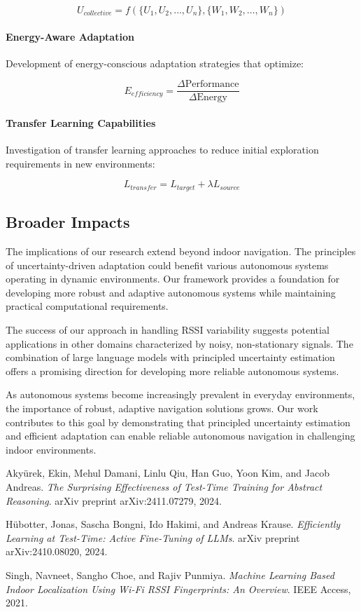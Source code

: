 \documentclass[12pt]{article}
\begin{document}
\[
U_{collective} = f(\{U_1, U_2, \ldots, U_n\}, \{W_1, W_2, \ldots, W_n\})
\]

\paragraph{Energy-Aware Adaptation}
Development of energy-conscious adaptation strategies that optimize:

\[
E_{efficiency} = \frac{\Delta \text{Performance}}{\Delta \text{Energy}}
\]

\paragraph{Transfer Learning Capabilities}
Investigation of transfer learning approaches to reduce initial exploration requirements in new environments:

\[
L_{transfer} = L_{target} + \lambda L_{source}
\]

\subsection{Broader Impacts}
The implications of our research extend beyond indoor navigation. The principles of uncertainty-driven adaptation could benefit various autonomous systems operating in dynamic environments. Our framework provides a foundation for developing more robust and adaptive autonomous systems while maintaining practical computational requirements.

The success of our approach in handling RSSI variability suggests potential applications in other domains characterized by noisy, non-stationary signals. The combination of large language models with principled uncertainty estimation offers a promising direction for developing more reliable autonomous systems.

As autonomous systems become increasingly prevalent in everyday environments, the importance of robust, adaptive navigation solutions grows. Our work contributes to this goal by demonstrating that principled uncertainty estimation and efficient adaptation can enable reliable autonomous navigation in challenging indoor environments.

\begin{thebibliography}{9}

Akyürek, Ekin, Mehul Damani, Linlu Qiu, Han Guo, Yoon Kim, and Jacob Andreas.  
\textit{The Surprising Effectiveness of Test-Time Training for Abstract Reasoning}.  
arXiv preprint arXiv:2411.07279, 2024.

Hübotter, Jonas, Sascha Bongni, Ido Hakimi, and Andreas Krause.  
\textit{Efficiently Learning at Test-Time: Active Fine-Tuning of LLMs}.  
arXiv preprint arXiv:2410.08020, 2024.

Singh, Navneet, Sangho Choe, and Rajiv Punmiya.  
\textit{Machine Learning Based Indoor Localization Using Wi-Fi RSSI Fingerprints: An Overview}.  
IEEE Access, 2021.

\end{thebibliography}
\end{document}
